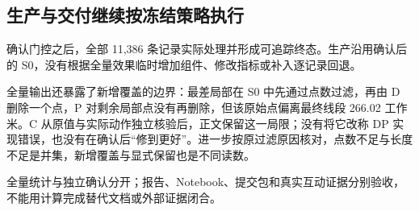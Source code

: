 \subsection{生产与交付继续按冻结策略执行}
确认门控之后，全部 11,386 条记录实际处理并形成可追踪终态。生产沿用确认后的 S0，没有根据全量效果临时增加组件、修改指标或补入逐记录回退。

全量输出还暴露了新增覆盖的边界：最差局部在 S0 中先通过点数过滤，再由 D 删除一个点，P 对剩余局部点没有再删除，但该原始点偏离最终线段 266.02 工作米。C 从原值与实际动作独立核验后，正文保留这一局限；没有将它改称 DP 实现错误，也没有在确认后“修到更好”。进一步按原过滤原因核对，点数不足与长度不足是并集，新增覆盖与显式保留也是不同读数。

全量统计与独立确认分开；报告、Notebook、提交包和真实互动证据分别验收，不能用计算完成替代文档或外部证据闭合。
